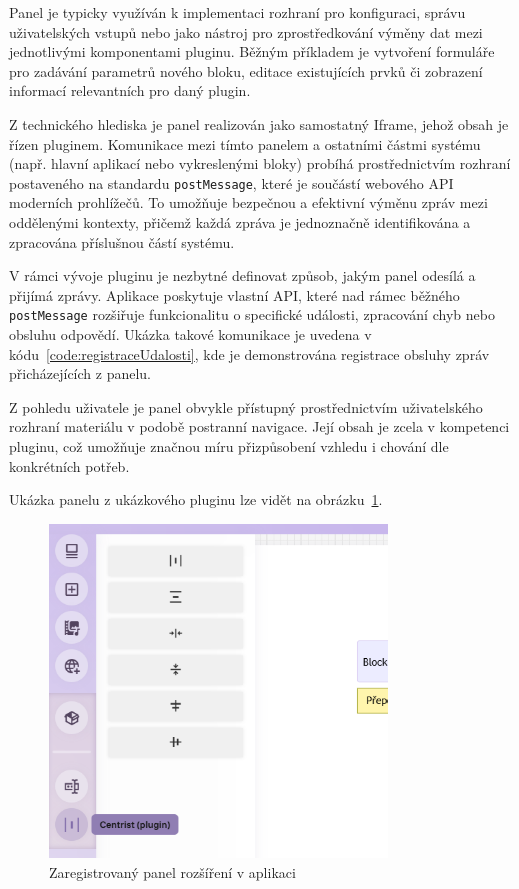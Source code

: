 Panel je typicky využíván k implementaci rozhraní pro konfiguraci, správu uživatelských vstupů nebo jako nástroj pro zprostředkování výměny dat mezi jednotlivými komponentami pluginu. 
Běžným příkladem je vytvoření formuláře pro zadávání parametrů nového bloku, editace existujících prvků či zobrazení informací relevantních pro daný plugin.

Z technického hlediska je panel realizován jako samostatný Iframe, jehož obsah je řízen pluginem. 
Komunikace mezi tímto panelem a ostatními částmi systému (např. hlavní aplikací nebo vykreslenými bloky) probíhá prostřednictvím rozhraní postaveného na standardu \texttt{postMessage}, které je součástí webového API moderních prohlížečů. 
To umožňuje bezpečnou a efektivní výměnu zpráv mezi oddělenými kontexty, přičemž každá zpráva je jednoznačně identifikována a zpracována příslušnou částí systému.

V rámci vývoje pluginu je nezbytné definovat způsob, jakým panel odesílá a přijímá zprávy. 
Aplikace poskytuje vlastní API, které nad rámec běžného \texttt{postMessage} rozšiřuje funkcionalitu o specifické události, zpracování chyb nebo obsluhu odpovědí. 
Ukázka takové komunikace je uvedena v kódu~\ref{code:registraceUdalosti}, kde je demonstrována registrace obsluhy zpráv přicházejících z panelu.

Z pohledu uživatele je panel obvykle přístupný prostřednictvím uživatelského rozhraní materiálu v podobě postranní navigace. 
Její obsah je zcela v kompetenci pluginu, což umožňuje značnou míru přizpůsobení vzhledu i chování dle konkrétních potřeb.

Ukázka panelu z ukázkového pluginu lze vidět na obrázku~\ref{fig:realizace/panel}.




\begin{figure}[ht!]
    \centering
    \includegraphics[width=0.8\textwidth]{media/05_realizace/panel.png}
    \caption{Zaregistrovaný panel rozšíření v aplikaci}
    \label{fig:realizace/panel}
\end{figure}

